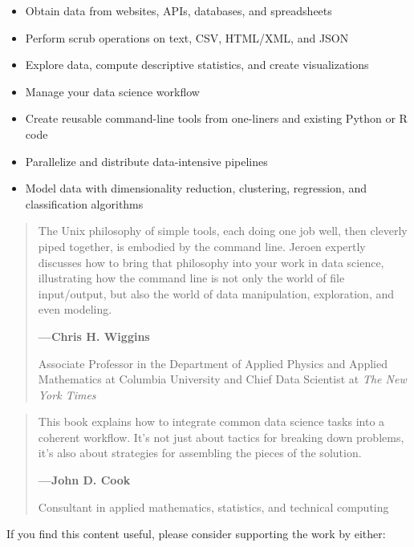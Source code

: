 \documentclass[
]{book}
\providecommand{\tightlist}{%
  \setlength{\itemsep}{0pt}\setlength{\parskip}{0pt}}
\theoremstyle{definition}
\theoremstyle{definition}
\theoremstyle{definition}
\theoremstyle{remark}
\begin{document}
\begin{itemize}
\tightlist
\item
  Obtain data from websites, APIs, databases, and spreadsheets
\item
  Perform scrub operations on text, CSV, HTML/XML, and JSON
\item
  Explore data, compute descriptive statistics, and create visualizations
\item
  Manage your data science workflow
\item
  Create reusable command-line tools from one-liners and existing Python or R code
\item
  Parallelize and distribute data-intensive pipelines
\item
  Model data with dimensionality reduction, clustering, regression, and classification algorithms
\end{itemize}

\begin{quote}
The Unix philosophy of simple tools, each doing one job well, then cleverly piped together, is embodied by the command line. Jeroen expertly discusses how to bring that philosophy into your work in data science, illustrating how the command line is not only the world of file input/output, but also the world of data manipulation, exploration, and even modeling.

\textbf{---Chris H. Wiggins}

Associate Professor in the Department of Applied Physics and Applied Mathematics at Columbia University and Chief Data Scientist at \emph{The New York Times}
\end{quote}

\begin{quote}
This book explains how to integrate common data science tasks into a coherent workflow. It's not just about tactics for breaking down problems, it's also about strategies for assembling the pieces of the solution.

\textbf{---John D. Cook}

Consultant in applied mathematics, statistics, and technical computing
\end{quote}

If you find this content useful, please consider supporting the work by either:
\end{document}
